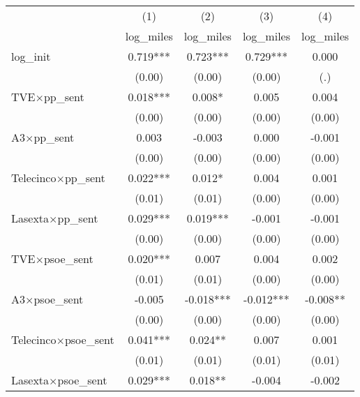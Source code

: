 \begin{tabular}{l*{4}{c}}
\toprule
                    &\multicolumn{1}{c}{(1)}&\multicolumn{1}{c}{(2)}&\multicolumn{1}{c}{(3)}&\multicolumn{1}{c}{(4)}\\
                    &\multicolumn{1}{c}{log\_miles}&\multicolumn{1}{c}{log\_miles}&\multicolumn{1}{c}{log\_miles}&\multicolumn{1}{c}{log\_miles}\\
\midrule
log\_init            &       0.719***&       0.723***&       0.729***&       0.000   \\
                    &      (0.00)   &      (0.00)   &      (0.00)   &         (.)   \\
TVE$\times$pp\_sent  &       0.018***&       0.008*  &       0.005   &       0.004   \\
                    &      (0.00)   &      (0.00)   &      (0.00)   &      (0.00)   \\
A3$\times$pp\_sent   &       0.003   &      -0.003   &       0.000   &      -0.001   \\
                    &      (0.00)   &      (0.00)   &      (0.00)   &      (0.00)   \\
Telecinco$\times$pp\_sent&       0.022***&       0.012*  &       0.004   &       0.001   \\
                    &      (0.01)   &      (0.01)   &      (0.00)   &      (0.00)   \\
Lasexta$\times$pp\_sent&       0.029***&       0.019***&      -0.001   &      -0.001   \\
                    &      (0.00)   &      (0.00)   &      (0.00)   &      (0.00)   \\
TVE$\times$psoe\_sent&       0.020***&       0.007   &       0.004   &       0.002   \\
                    &      (0.01)   &      (0.01)   &      (0.00)   &      (0.00)   \\
A3$\times$psoe\_sent &      -0.005   &      -0.018***&      -0.012***&      -0.008** \\
                    &      (0.00)   &      (0.00)   &      (0.00)   &      (0.00)   \\
Telecinco$\times$psoe\_sent&       0.041***&       0.024** &       0.007   &       0.001   \\
                    &      (0.01)   &      (0.01)   &      (0.01)   &      (0.01)   \\
Lasexta$\times$psoe\_sent&       0.029***&       0.018** &      -0.004   &      -0.002   \\

\end{tabular}
